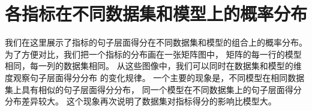 
\chapter{各指标在不同数据集和模型上的概率分布}
\label{ch:metric_dist}
我们在这里展示了指标的句子层面得分在不同数据集和模型的组合上的概率分布。
为了方便对比，我们把一个指标的分布画在一张矩阵图中，
矩阵的每一行的模型相同，每一列的数据集相同。
从这些图像中，我们可以同时在数据集和模型的维度观察句子层面得分分布
的变化规律。
一个主要的现象是，不同模型在相同数据集上具有相似的句子层面得分分布，
同一个模型在不同数据集上的句子层面得分分布差异较大。
这个现象再次说明了数据集对指标得分的影响比模型大。





